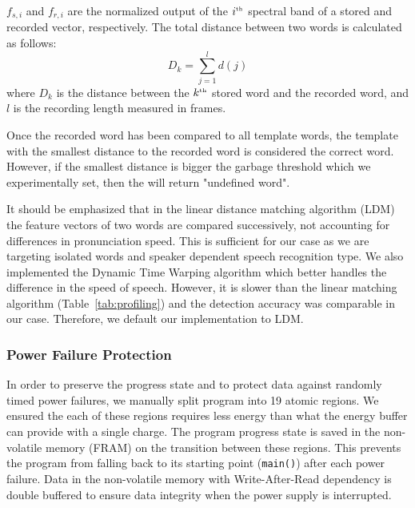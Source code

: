 $f_{s,i}$ and $f_{r,i}$ are the normalized output of the $i^{\text{\tiny th}}$ spectral band of a stored and recorded vector, respectively.  
The total distance between two words is calculated as follows:
\begin{equation}
		D_k = \sum\limits^{l}_{j=1} d(j)
\end{equation}
where $D_k$ is the distance between the $k^{\text{\tiny th}}$ stored word and the recorded word, and $l$ is the recording length measured in frames.

Once the recorded word has been compared to all \cim template words, the template with the smallest distance to the recorded word is considered the correct word. However, if the smallest distance is bigger the garbage threshold which we experimentally set, then the \cim will return "undefined word". 

It should be emphasized that in the linear distance matching algorithm (LDM) the feature vectors of two words are compared successively, not accounting for differences in pronunciation speed. This is sufficient for our case as we are targeting isolated words and speaker dependent speech recognition type. We also implemented the Dynamic Time Warping algorithm which better handles the difference in the speed of speech. However, it is slower than the linear matching algorithm  (Table~\ref{tab:profiling}) and the detection accuracy was comparable in our case. Therefore, we default our implementation to LDM. 

\subsubsection{Power Failure Protection}
In order to preserve the progress state and to protect \cim data against randomly timed power failures, we manually split \cim program into 19 atomic regions. We ensured the each of these regions requires less energy than what the energy buffer can provide with a single charge. The program progress state is saved in the non-volatile memory (FRAM) on the transition between these regions. This prevents the program from falling back to its starting point (\texttt{main()}) after each power failure. Data in the non-volatile memory with Write-After-Read dependency is double buffered to ensure data integrity when the power supply is interrupted. 

